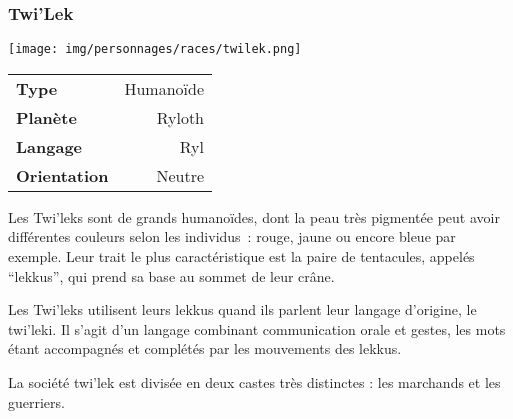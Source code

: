 \subsubsection{Twi’Lek}
\begin{samepage}
	\vspace{-1\baselineskip}
	\texttt{[image: img/personnages/races/twilek.png]}
	\vspace{-5\baselineskip}
	\begin{flushright}
		\begin{tabular}{|l|r|}
			\textbf{Type} 			& Humanoïde \\
		   	\textbf{Planète} 		& Ryloth \\
		   	\textbf{Langage} 		& Ryl \\
		   	\textbf{Orientation} 	& Neutre \\
		\end{tabular}
	\end{flushright}
\end{samepage}

Les Twi’leks sont de grands humanoïdes, dont la peau très pigmentée peut avoir différentes couleurs selon les individus~: rouge, jaune ou encore bleue par exemple. Leur trait le plus caractéristique est la paire de tentacules, appelés “lekkus”, qui prend sa base au sommet de leur crâne.

Les Twi’leks utilisent leurs lekkus quand ils parlent leur langage d’origine, le twi’leki. Il s’agit d’un langage combinant communication orale et gestes, les mots étant accompagnés et complétés par les mouvements des lekkus.

La société twi’lek est divisée en deux castes très distinctes : les marchands et les guerriers.

